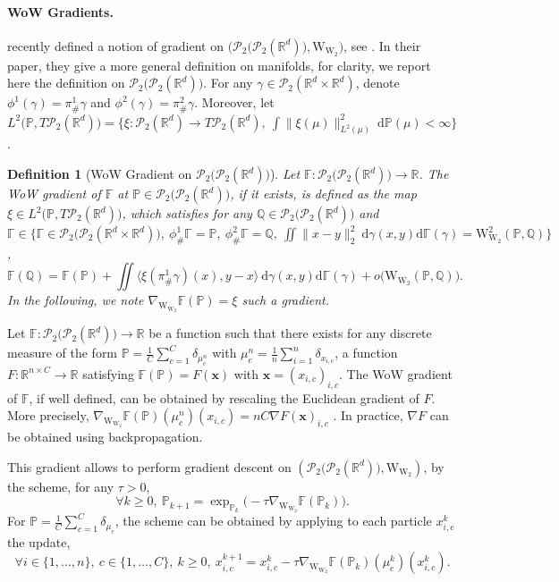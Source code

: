 \documentclass[twoside]{article}
\newtheorem{definition}{Definition}
\newcommand{\cP}{\mathcal{P}}
\newcommand{\bP}{\mathbb{P}}
\newcommand{\bQ}{\mathbb{Q}}
\newcommand{\bF}{\mathbb{F}}
\newcommand{\bGamma}{\mathbb{\Gamma}}
\newcommand{\Ww}{\W_{\W_2}}
\newcommand{\gWw}{\nabla_{\Ww}}
\newcommand{\cPP}[1]{\mathcal{P}_2\big(\cP_2(#1)\big)}
\newcommand{\W}{\mathrm{W}}
\newcommand{\R}{\mathbb{R}}
\begin{document}
\paragraph{WoW Gradients.}

\citet{bonet2025flowing} recently defined a notion of gradient on $\big(\cPP{\R^d}, \Ww\big)$, see \citep[Definition 3.3]{bonet2025flowing}. In their paper, they give a more general definition on manifolds, for clarity, we report here the definition on $\cPP{\R^d}$. For any $\gamma\in\cP_2(\R^d\times \R^d)$, denote $\phi^1(\gamma)=\pi^1_\#\gamma$ and $\phi^2(\gamma)=\pi^2_\#\gamma$. Moreover, let $ L^2\big(\bP, T\cP_2(\R^d)\big)=\{\xi:\cP_2(\R^d)\to T\cP_2(\R^d),\ \int \|\xi(\mu)\|_{L^2(\mu)}^2\ \mathrm{d}\bP(\mu) < \infty\}$.

\begin{definition}[WoW Gradient on $\cPP{\R^d}$]
    Let $\bF:\cPP{\R^d}\to \R$. The WoW gradient of $\bF$ at $\bP\in\cPP{\R^d}$, if it exists, is defined as the map $\xi\in L^2\big(\bP, T\cP_2(\R^d)\big)$, which satisfies for any $\bQ\in\cPP{\R^d}$ and $\bGamma\in \{\bGamma\in \cPP{\R^d\times\R^d},\ \phi^1_\#\bGamma=\bP, \ \phi^2_\#\bGamma=\bQ,\ \iint \|x-y\|_2^2\ \mathrm{d}\gamma(x,y)\mathrm{d}\bGamma(\gamma)=\Ww^2(\bP,\bQ)\}$,
    \begin{equation}
        \bF(\bQ) = \bF(\bP) + \iint \langle \xi(\pi^1_\#\gamma)(x), y-x\rangle\ \mathrm{d}\gamma(x,y)\mathrm{d}\bGamma(\gamma) + o\big(\Ww(\bP,\bQ)\big).
    \end{equation}
    In the following, we note $\gWw\bF(\bP)=\xi$ such a gradient.
\end{definition}

Let $\bF:\cPP{\R^d}\to \R$ be a function such that there exists for any discrete measure of the form $\bP=\frac1C\sum_{c=1}^C\delta_{\mu_c^n}$ with $\mu_c^n = \frac1n\sum_{i=1}^n \delta_{x_{i,c}}$, a function $F:\R^{n\times C}\to \R$ satisfying $\bF(\bP)=F(\textbf{x})$ with $\textbf{x}=(x_{i,c})_{i,c}$. The WoW gradient of $\bF$, if well defined, can be obtained by rescaling the Euclidean gradient of $F$. More precisely, $\gWw\bF(\bP)(\mu_c^n)(x_{i,c}) = nC \nabla F(\textbf{x})_{i,c}$ \citep[Proposition B.7]{bonet2025flowing}. In practice, $\nabla F$ can be obtained using backpropagation.

This gradient allows to perform gradient descent on $(\cPP{\R^d},\Ww)$, by the scheme, for any $\tau>0$, 
\begin{equation}
    \forall k\ge 0,\ \bP_{k+1} = \exp_{\bP_k}\big(-\tau \gWw\bF(\bP_k)\big).
\end{equation}
For $\bP = \frac1C\sum_{c=1}^C \delta_{\mu_c}$, the scheme can be obtained by applying to each particle $x_{i,c}^k$ the update,
\begin{equation}
    \forall i\in\{1,\dots,n\},\ c\in\{1,\dots,C\}, \ k\ge 0,\ x_{i,c}^{k+1} = x_{i,c}^k - \tau \gWw\bF(\bP_k)(\mu_c^k)(x_{i,c}^k).
\end{equation}
\end{document}
